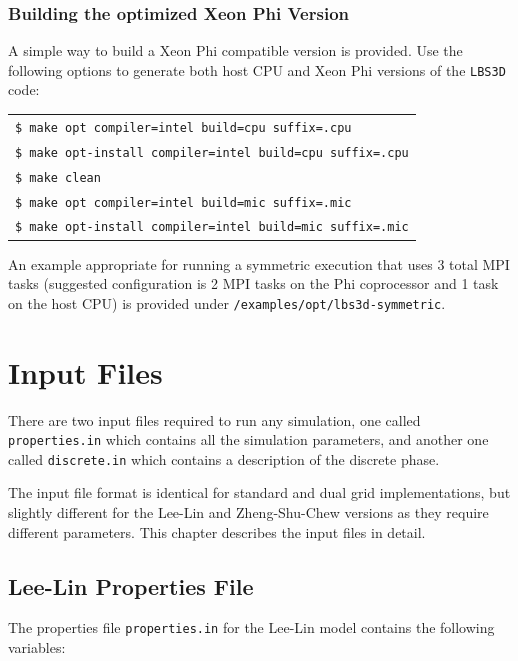\documentclass[12pt]{report}
\begin{document}
\subsection{Building the optimized Xeon Phi Version}
A simple way to build a Xeon Phi compatible version is provided. Use the following options to generate both host CPU and Xeon Phi versions of the \verb+LBS3D+ code:

\begin{tabular}{l}
\texttt{\$ make opt compiler=intel build=cpu suffix=.cpu}\\
\texttt{\$ make opt-install compiler=intel build=cpu suffix=.cpu}\\
\texttt{\$ make clean}\\
\texttt{\$ make opt compiler=intel build=mic suffix=.mic}\\
\texttt{\$ make opt-install compiler=intel build=mic suffix=.mic}
\end{tabular}

An example appropriate for running a symmetric execution that uses 3 total MPI tasks (suggested configuration is 2 MPI tasks on the Phi coprocessor and 1 task on the host CPU) is provided under \verb+/examples/opt/lbs3d-symmetric+.

\chapter{Input Files}
There are two input files required to run any simulation, one called \verb+properties.in+ which contains all the simulation parameters, and another one called \verb+discrete.in+ which contains a description of the discrete phase.

The input file format is identical for standard and dual grid implementations, but slightly different for the Lee-Lin and Zheng-Shu-Chew versions as they require different parameters. This chapter describes the input files in detail.

\section{Lee-Lin Properties File}
The properties file \verb+properties.in+ for the Lee-Lin model contains the following variables:
\end{document}
